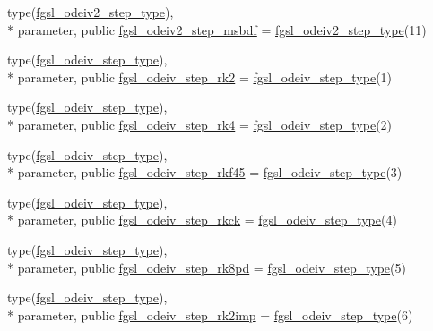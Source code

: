 \begin{DoxyCompactItemize}
\item 
type(\hyperlink{structfgsl_1_1fgsl__odeiv2__step__type}{fgsl\-\_\-odeiv2\-\_\-step\-\_\-type}), \\*
parameter, public \hyperlink{classfgsl_a125bb5f7c78cd4dda6b7a957e8867653}{fgsl\-\_\-odeiv2\-\_\-step\-\_\-msbdf} = \hyperlink{structfgsl_1_1fgsl__odeiv2__step__type}{fgsl\-\_\-odeiv2\-\_\-step\-\_\-type}(11)
\item 
type(\hyperlink{structfgsl_1_1fgsl__odeiv__step__type}{fgsl\-\_\-odeiv\-\_\-step\-\_\-type}), \\*
parameter, public \hyperlink{classfgsl_aa58b6af1260738ff3a83d7910e978b32}{fgsl\-\_\-odeiv\-\_\-step\-\_\-rk2} = \hyperlink{structfgsl_1_1fgsl__odeiv__step__type}{fgsl\-\_\-odeiv\-\_\-step\-\_\-type}(1)
\item 
type(\hyperlink{structfgsl_1_1fgsl__odeiv__step__type}{fgsl\-\_\-odeiv\-\_\-step\-\_\-type}), \\*
parameter, public \hyperlink{classfgsl_a466a47d91e65ed8da5395e1e1cb53a2c}{fgsl\-\_\-odeiv\-\_\-step\-\_\-rk4} = \hyperlink{structfgsl_1_1fgsl__odeiv__step__type}{fgsl\-\_\-odeiv\-\_\-step\-\_\-type}(2)
\item 
type(\hyperlink{structfgsl_1_1fgsl__odeiv__step__type}{fgsl\-\_\-odeiv\-\_\-step\-\_\-type}), \\*
parameter, public \hyperlink{classfgsl_ad73c3dd0c5faf790ac4fe7c6bdfe0b75}{fgsl\-\_\-odeiv\-\_\-step\-\_\-rkf45} = \hyperlink{structfgsl_1_1fgsl__odeiv__step__type}{fgsl\-\_\-odeiv\-\_\-step\-\_\-type}(3)
\item 
type(\hyperlink{structfgsl_1_1fgsl__odeiv__step__type}{fgsl\-\_\-odeiv\-\_\-step\-\_\-type}), \\*
parameter, public \hyperlink{classfgsl_a0c2cde787f3c705f883a74b1be126952}{fgsl\-\_\-odeiv\-\_\-step\-\_\-rkck} = \hyperlink{structfgsl_1_1fgsl__odeiv__step__type}{fgsl\-\_\-odeiv\-\_\-step\-\_\-type}(4)
\item 
type(\hyperlink{structfgsl_1_1fgsl__odeiv__step__type}{fgsl\-\_\-odeiv\-\_\-step\-\_\-type}), \\*
parameter, public \hyperlink{classfgsl_a104f6eb85d1676e32d4aa0a93531ef61}{fgsl\-\_\-odeiv\-\_\-step\-\_\-rk8pd} = \hyperlink{structfgsl_1_1fgsl__odeiv__step__type}{fgsl\-\_\-odeiv\-\_\-step\-\_\-type}(5)
\item 
type(\hyperlink{structfgsl_1_1fgsl__odeiv__step__type}{fgsl\-\_\-odeiv\-\_\-step\-\_\-type}), \\*
parameter, public \hyperlink{classfgsl_a0352c460177df9a983fc5984dd5be04a}{fgsl\-\_\-odeiv\-\_\-step\-\_\-rk2imp} = \hyperlink{structfgsl_1_1fgsl__odeiv__step__type}{fgsl\-\_\-odeiv\-\_\-step\-\_\-type}(6)

\end{DoxyCompactItemize}
